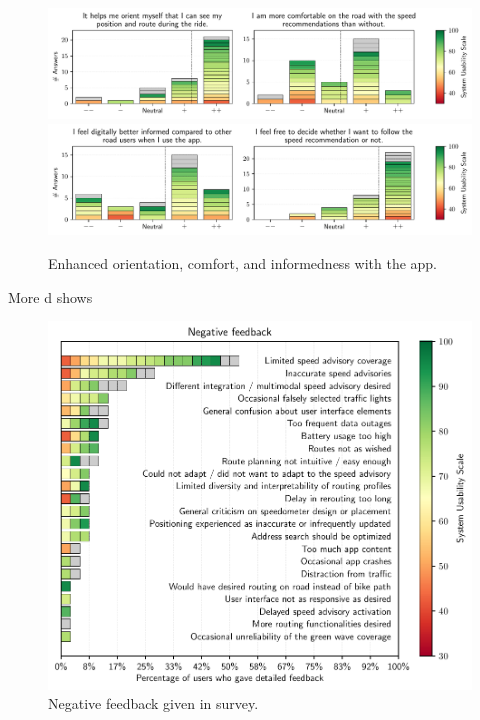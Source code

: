 \begin{figure}[t]
\caption{Enhanced orientation, comfort, and informedness with the app.}\label{fig:app-enhanced-orientation}
\includegraphics[width=\linewidth]{images/app-usability-questions-app-enhanced-orientation.pdf}
\\
\includegraphics[width=\linewidth]{images/app-usability-questions-app-informedness-freedom.pdf}
\end{figure}

More d    shows 

\begin{figure}[t]
\caption{Negative feedback given in survey.}\label{fig:app-negative-feedback}
\includegraphics[width=\linewidth]{images/app-feedback-negative.pdf}
\end{figure}


